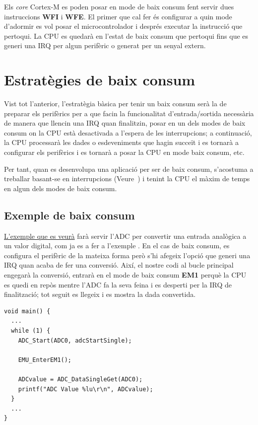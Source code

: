 Els {\em core} Cortex-M es poden posar en mode de baix consum fent servir dues instruccions {\bf WFI} i {\bf WFE}. El primer que cal fer és configurar a quin mode d'adormir es vol posar el microcontrolador i després executar la instrucció que pertoqui. La CPU es quedarà en l'estat de baix consum que pertoqui fins que es generi una \gls{IRQ} per algun perifèric o generat per un senyal extern.

\section{Estratègies de baix consum}
\label{sec:lowpowerstrategies}
Vist tot l'anterior, l'estratègia bàsica per tenir un baix consum serà la de preparar els perifèrics per a que facin la funcionalitat d'entrada/sortida necessària de manera que llencin una \gls{IRQ} quan finalitzin, posar en un dels modes de baix consum on la CPU està desactivada a l'espera de les interrupcions; a continuació, la CPU processarà les dades o esdeveniments que hagin succeït i es tornarà a configurar els perifèrics i es tornarà a posar la CPU en mode baix consum, etc.

Per tant, quan es desenvolupa una aplicació per ser de baix consum, s'acostuma a treballar basant-se en interrupcions (Veure~) i tenint la CPU el màxim de temps en algun dels modes de baix consum.

\subsection{Exemple de baix consum}
\href{https://github.com/mariusmm/cursembedded/tree/master/Simplicity/ADC_1_LP}{L'exemple que es veurà} farà servir l'\gls{ADC} per convertir una entrada analògica a un valor digital, com ja es a fer a l'exemple . En el cas de baix consum, es configura el perifèric de la mateixa forma però s'hi afegeix l'opció que generi una \gls{IRQ} quan acaba de fer una conversió. Així, el nostre codi al bucle principal engegarà la conversió, entrarà en el mode de baix consum {\bf EM1} perquè la CPU es quedi en repòs mentre l'ADC fa la seva feina i es desperti per la \gls{IRQ} de finalització; tot seguit es llegeix i es mostra la dada convertida.

\begin{lstlisting}[style=customc,caption={Bucle principal amb funcions de baix consum}, label=ADC_LP]
void main() {
  ...
  while (1) {
    ADC_Start(ADC0, adcStartSingle);

    EMU_EnterEM1();

    ADCvalue = ADC_DataSingleGet(ADC0);
    printf("ADC Value %lu\r\n", ADCvalue);
  }
  ...
}
\end{lstlisting}

